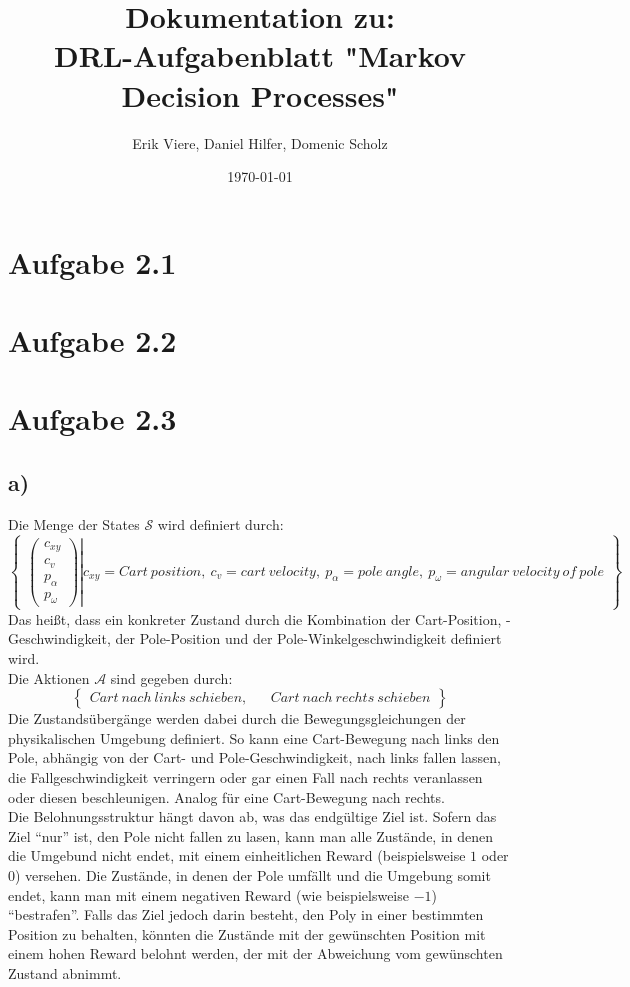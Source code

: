 \documentclass[11pt]{article}
\title{\textbf{Dokumentation zu:\\DRL-Aufgabenblatt "Markov Decision Processes"}}
\author{Erik Viere, Daniel Hilfer, Domenic Scholz}
\date{\today}
\begin{document}
\maketitle	
\pagebreak

\section*{Aufgabe 2.1}
\section*{Aufgabe 2.2}
\section*{Aufgabe 2.3}
\subsection*{a)}
Die Menge der States $\mathcal{S}$ wird definiert durch:
\[ %
\begin{Bmatrix}
    \left.
    \begin{pmatrix}
        c_{xy}\\
        c_v\\
        p_\alpha\\
        p_\omega
    \end{pmatrix}
    \right\vert
    c_{xy} = Cart~position,~c_v = cart~velocity,~p_\alpha = pole~angle,~p_\omega = angular~velocity~of~pole
\end{Bmatrix}
\]%
Das heißt, dass ein konkreter Zustand durch die Kombination der Cart-Position, -Geschwindigkeit, der Pole-Position und der Pole-Winkelgeschwindigkeit definiert wird.\\
Die Aktionen $\mathcal{A}$ sind gegeben durch:
\[ %
\begin{Bmatrix}
    Cart~nach~links~schieben, && Cart~nach~rechts~schieben
\end{Bmatrix}
\]%
Die Zustandsübergänge werden dabei durch die Bewegungsgleichungen der physikalischen Umgebung definiert. So kann eine Cart-Bewegung nach links den Pole, abhängig von der Cart- und Pole-Geschwindigkeit, nach links fallen lassen, die Fallgeschwindigkeit verringern oder gar einen Fall nach rechts veranlassen oder diesen beschleunigen. Analog für eine Cart-Bewegung nach rechts.\\
Die Belohnungsstruktur hängt davon ab, was das endgültige Ziel ist. Sofern das Ziel ``nur'' ist, den Pole nicht fallen zu lasen, kann man alle Zustände, in denen die Umgebund nicht endet, mit einem einheitlichen Reward (beispielsweise $1$ oder $0$) versehen. Die Zustände, in denen der Pole umfällt und die Umgebung somit endet, kann man mit einem negativen Reward (wie beispielsweise $-1$) ``bestrafen''. Falls das Ziel jedoch darin besteht, den Poly in einer bestimmten Position zu behalten, könnten die Zustände mit der gewünschten Position mit einem hohen Reward belohnt werden, der mit der Abweichung vom gewünschten Zustand abnimmt.\\
\end{document}

